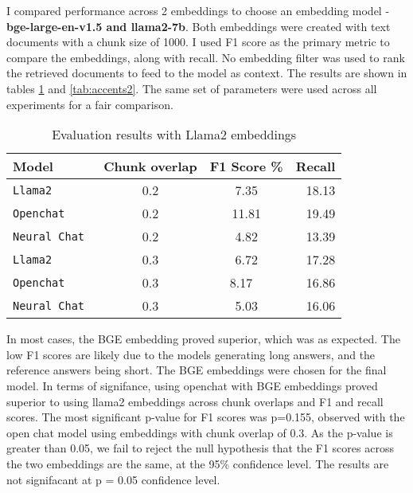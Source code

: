 \documentclass[11pt]{article}
\begin{document}
I compared performance across 2 embeddings to choose an embedding model - \textbf{bge-large-en-v1.5 and llama2-7b}. Both embeddings were created with text documents with a chunk size of 1000. I used F1 score as the primary metric to compare the embeddings, along with recall. No embedding filter was used to rank the retrieved documents to feed to the model as context. The results are shown in tables \ref{tab:accents} and \ref{tab:accents2}. 
The same set of parameters were used across all experiments for a fair comparison.
\begin{table}
\centering
  \begin{tabular}{ l c c r }
  \hline
    \textbf{Model} & \textbf{Chunk overlap} & \textbf{F1 Score \%} & \textbf{Recall}\\
    \hline
    \verb|Llama2 | & 0.2   &  {7.35} & {18.13} \\
    \verb|Openchat | &  0.2 & {11.81}  & {19.49}\\ 
    \verb|Neural Chat | & 0.2  & {4.82}  & {13.39}\\ 
    \verb|Llama2 | &  0.3 &  {6.72}  & {17.28}\\
    \verb|Openchat | &  0.3 & {8.17} \ & {16.86} \\ 
    \verb|Neural Chat | & 0.3 & {5.03}  & {16.06}\\ 
    \hline
  \end{tabular}
\caption{Evaluation results with Llama2 embeddings}
\label{tab:accents}
\end{table}

  In most cases, the BGE embedding proved superior, which was as expected. The low F1 scores are likely due to the models generating long answers, and the reference answers being short. The BGE embeddings were chosen for the final model.
  In terms of signifance, using openchat with BGE embeddings proved superior to using llama2 embeddings across chunk overlaps and F1 and recall scores.
  The most significant p-value for F1 scores was p=0.155, observed with the open chat model using embeddings with chunk overlap of 0.3.
  As the p-value is greater than 0.05, we fail to reject the null hypothesis that the F1 scores across the two embeddings are the same, at the 95\% confidence level.
  The results are not signifacant at p = 0.05 confidence level.
\end{document}
